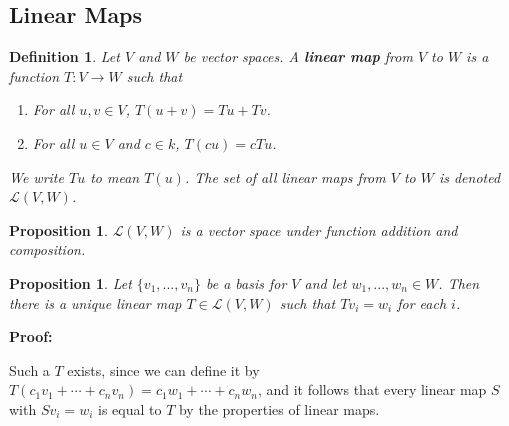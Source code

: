 \documentclass{article}
\theoremstyle{colontheorem}
\newtheorem{proposition}[theorem]{Proposition}
\newtheorem{definition}[theorem]{Definition}
\newenvironment{Proposition}
{
	\begin{mdframed}[backgroundcolor=TheoremOrange!10]
	\begin{proposition}
}
{
	\end{proposition}
	\end{mdframed}
	
	\vspace{.15in}
}
\newenvironment{Def}
{
	\begin{mdframed}[backgroundcolor=DefGreen!10]
	\begin{definition}
}
{
	\end{definition}
	\end{mdframed}
	
	\vspace{.15in}
}
\newenvironment{Proof}
{
	\vspace{-.3in}
	
	\begin{mdframed}[backgroundcolor=ProofPurple!10]
	\textbf{Proof:}%
}
{
	\end{mdframed}
	
	\vspace{.15in}
}
\begin{document}
\begin{center}
	\pagebreak
	
	\section{Linear Maps}
	
	\vspace{.1in}
\end{center}



\begin{Def}
	
	Let $V$ and $W$ be vector spaces. A \textbf{linear map} from $V$ to $W$ is a function $T: V \longrightarrow W$ such that
	
	\begin{enumerate}
		
		\item For all $u, v \in V$, $T(u+v) = Tu + Tv$.
		
		\item For all $u \in V$ and $c \in k$, $T(cu) = cTu$.
		
	\end{enumerate}

	We write $Tu$ to mean $T(u)$. The set of all linear maps from $V$ to $W$ is denoted $\mathcal{L}(V, W)$.
	
\end{Def}



\begin{Proposition}
	
	$\mathcal{L}(V, W)$ is a vector space under function addition and composition.
	
\end{Proposition}



\begin{Proposition}
	
	Let $\{v_1, ..., v_n\}$ be a basis for $V$ and let $w_1, ..., w_n \in W$. Then there is a unique linear map $T \in \mathcal{L}(V,W)$ such that $Tv_i = w_i$ for each $i$.
	
\end{Proposition}



\begin{Proof}
	Such a $T$ exists, since we can define it by $T(c_1 v_1 + \cdots + c_n v_n) = c_1 w_1 + \cdots + c_n w_n$, and it follows that every linear map $S$ with $Sv_i = w_i$ is equal to $T$ by the properties of linear maps.
	
\end{Proof}
\end{document}
